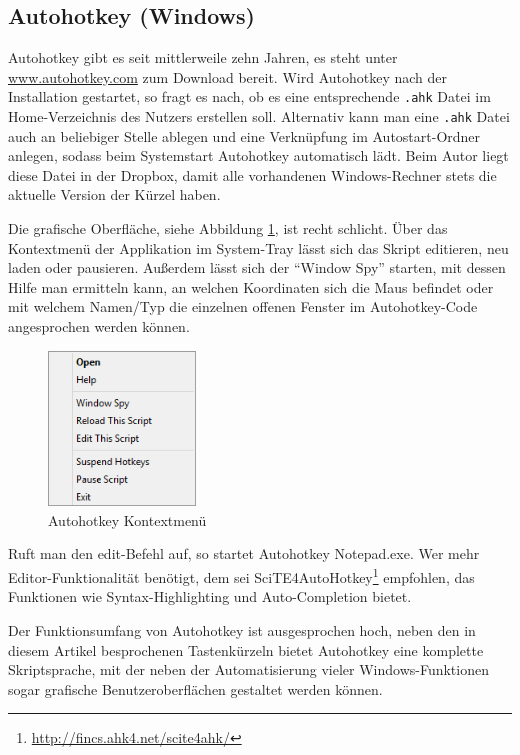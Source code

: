 \documentclass[ngerman]{dtk}%
\newcommand{\ahk}{Autohotkey\xspace}
\begin{document}
\subsection{Autohotkey (Windows)}

\ahk gibt es seit mittlerweile zehn Jahren, es steht unter \url{www.autohotkey.com} zum Download bereit. Wird \ahk nach der Installation gestartet, so fragt es nach, ob es eine entsprechende \texttt{.ahk} Datei im Home-Verzeichnis des Nutzers erstellen soll. Alternativ kann man eine \texttt{.ahk} Datei auch an beliebiger Stelle ablegen und eine Verknüpfung im Autostart-Ordner anlegen, sodass beim Systemstart \ahk automatisch lädt. Beim Autor liegt diese Datei in der Dropbox, damit alle vorhandenen Windows-Rechner stets die aktuelle Version der Kürzel haben.

Die grafische Oberfläche, siehe Abbildung \ref{fig:ahk}, ist recht schlicht. Über das Kontextmenü der Applikation im System-Tray lässt sich das Skript editieren, neu laden oder pausieren. Außerdem lässt sich der \enquote{Window Spy} starten, mit dessen Hilfe man ermitteln kann, an welchen Koordinaten sich die Maus befindet oder mit welchem Namen/Typ die einzelnen offenen Fenster im \ahk-Code angesprochen werden können.

\begin{figure}[h]
\begin{center}
\includegraphics[width=0.35\textwidth]{AutoHotkey_soft}
\caption{Autohotkey Kontextmenü}\label{fig:ahk}
\end{center}
\end{figure}

Ruft man den edit-Befehl auf, so startet \ahk Notepad.exe. Wer mehr Editor-Funktionalität benötigt, dem sei SciTE4AutoHotkey\footnote{\url{http://fincs.ahk4.net/scite4ahk/}} empfohlen, das Funktionen wie Syntax-Highlighting und Auto-Completion bietet.

Der Funktionsumfang von \ahk ist ausgesprochen hoch, neben den in diesem Artikel besprochenen Tastenkürzeln bietet \ahk eine komplette Skriptsprache, mit der neben der Automatisierung vieler Windows-Funktionen sogar grafische Benutzeroberflächen gestaltet werden können.
\end{document}
